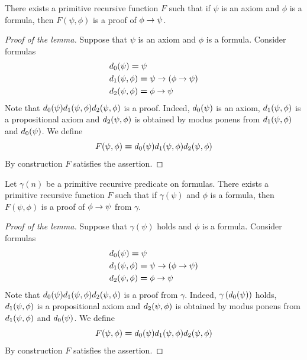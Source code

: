 \documentclass[10pt]{amsart}
\newcommand{\meq}{\boldsymbol{=}}
\begin{document}
\begin{lemma}\label{lemma:case_of_axiom}
  There exists a primitive recursive function $F$ such that if $\psi$ is an axiom and $\phi$ is a formula, then $F(\psi,\phi)$ is a proof of $\phi \rightarrow \psi$. 
\end{lemma}
\begin{proof}[Proof of the lemma]
Suppose that $\psi$ is an axiom and $\phi$ is a formula. Consider formulas
  \begin{align*}
    &d_{\rm{0}}(\psi) \meq \psi\\
    &d_{\rm{1}}(\psi, \phi) \meq \psi \ra \left(\phi \ra \psi\right)\\
    &d_{\rm{2}}(\psi, \phi) \meq \phi \ra \psi\\
  \end{align*}
  Note that $d_{\rm{0}}(\psi)d_{\rm{1}}(\psi, \phi)d_{\rm{2}}(\psi, \phi)$ is a proof. Indeed, $d_{\rm{0}}(\psi)$ is an axiom, $d_{\rm{1}}(\psi,\phi)$ is a propositional axiom and $d_{\rm{2}}(\psi,\phi)$ is obtained by modus ponens from $d_{\rm{1}}(\psi,\phi)$ and $d_{\rm{0}}(\psi)$. We define
  $$F(\psi, \phi) \meq d_{\rm{0}}(\psi)d_{\rm{1}}(\psi,\phi)d_{\rm{2}}(\psi,\phi)$$
  By construction $F$ satisfies the assertion.
\end{proof}

\begin{lemma}\label{lemma:case_of_gamma}
  Let $\gamma(n)$ be a primitive recursive predicate on formulas. There exists a primitive recursive function $F$ such that if $\gamma(\psi)$ and $\phi$ is a formula, then $F(\psi,\phi)$ is a proof of $\phi \rightarrow \psi$ from $\gamma$. 
\end{lemma}
\begin{proof}[Proof of the lemma]
Suppose that $\gamma(\psi)$ holds and $\phi$ is a formula. Consider formulas
  \begin{align*}
    &d_{\rm{0}}(\psi) \meq \psi\\
    &d_{\rm{1}}(\psi, \phi) \meq \psi \ra \left(\phi \ra \psi\right)\\
    &d_{\rm{2}}(\psi, \phi) \meq \phi \ra \psi\\
  \end{align*}
  Note that $d_{\rm{0}}(\psi)d_{\rm{1}}(\psi,\phi)d_{\rm{2}}(\psi,\phi)$ is a proof from $\gamma$. Indeed, $\gamma\left(d_{\rm{0}}(\psi)\right)$ holds, $d_{\rm{1}}(\psi,\phi)$ is a propositional axiom and $d_{\rm{2}}(\psi,\phi)$ is obtained by modus ponens from $d_{\rm{1}}(\psi,\phi)$ and $d_{\rm{0}}(\psi)$. We define
  $$F(\psi, \phi) \meq d_{\rm{0}}(\psi)d_{\rm{1}}(\psi,\phi)d_{\rm{2}}(\psi,\phi)$$
  By construction $F$ satisfies the assertion.
\end{proof}
\end{document}
